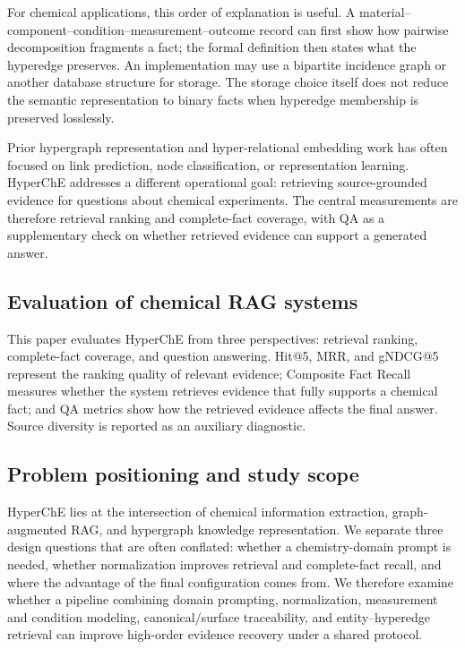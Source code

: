 For chemical applications, this order of explanation is useful. A material--component--condition--measurement--outcome record can first show how pairwise decomposition fragments a fact; the formal definition then states what the hyperedge preserves. An implementation may use a bipartite incidence graph or another database structure for storage. The storage choice itself does not reduce the semantic representation to binary facts when hyperedge membership is preserved losslessly.

Prior hypergraph representation and hyper-relational embedding work has often focused on link prediction, node classification, or representation learning. HyperChE addresses a different operational goal: retrieving source-grounded evidence for questions about chemical experiments. The central measurements are therefore retrieval ranking and complete-fact coverage, with QA as a supplementary check on whether retrieved evidence can support a generated answer.

\subsection{Evaluation of chemical RAG systems}

This paper evaluates HyperChE from three perspectives: retrieval ranking, complete-fact coverage, and question answering. Hit@5, MRR, and gNDCG@5 represent the ranking quality of relevant evidence; Composite Fact Recall measures whether the system retrieves evidence that fully supports a chemical fact; and QA metrics show how the retrieved evidence affects the final answer. Source diversity is reported as an auxiliary diagnostic.

\subsection{Problem positioning and study scope}

HyperChE lies at the intersection of chemical information extraction, graph-augmented RAG, and hypergraph knowledge representation. We separate three design questions that are often conflated: whether a chemistry-domain prompt is needed, whether normalization improves retrieval and complete-fact recall, and where the advantage of the final configuration comes from. We therefore examine whether a pipeline combining domain prompting, normalization, measurement and condition modeling, canonical/surface traceability, and entity--hyperedge retrieval can improve high-order evidence recovery under a shared protocol.

